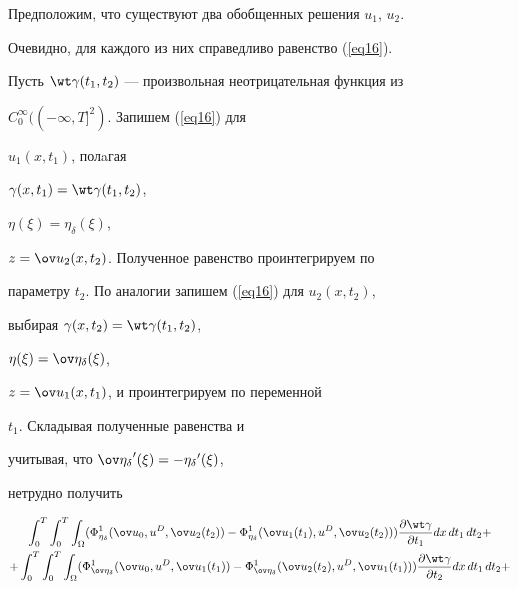 \begin{pf} 


Предположим, что существуют два обобщенных решения $u_{1}$, $u_{2}$.


Очевидно, для каждого из них справедливо равенство (\ref{eq16}). 


Пусть $\wt\gamma(t_{1},t_{2})$ --- произвольная неотрицательная функция из


$C^{\infty}_{0}((-\infty, T]^{2})$. Запишем (\ref{eq16}) для


$u_{1}(x,t_{1})$, полaгая 


$\gamma (x, t_{1})=\wt\gamma (t_{1}, t_{2})$,


$\eta (\xi)=\eta_{\delta} (\xi)$,


$z=\ov u_{2}(x, t_{2})$. Полученное равенство проинтегрируем по


параметру $t_{2}$. По аналогии запишем (\ref{eq16}) для $u_{2}(x, t_{2})$,


выбирая $\gamma (x, t_{2})=\wt \gamma (t_{1}, t_{2})$,


$\eta (\xi)=\ov \eta_{\delta} (\xi)$,


$z=\ov u_{1}(x, t_{1})$, и проинтегрируем по переменной 


$t_{1}$. Складывая полученные равенства и 


учитывая, что ${\ov \eta_{\delta}}'(\xi)=-{ \eta_{\delta}}'(\xi)$,


нетрудно получить


\begin{multline}


\label{eq25} 


\int_{0}^{T} \int_{0}^{T} \int_{\Omega}


(\Phi_{ \eta_{\delta}}^{1} (\ov u_{0}, u^{D}, \ov u_{2}(t_{2})) -


\Phi_{\eta_{\delta}}^{1} (\ov u_{1}(t_{1}), u^{D}, \ov u_{2}(t_{2})))


\frac{\partial \wt \gamma}{\partial t_{1}} dx\, dt_{1}\, dt_{2}+ \\


%


+\int_{0}^{T} \int_{0}^{T} \int_{\Omega}


(\Phi_{\ov \eta_{\delta}}^{1} (\ov u_{0}, u^{D}, \ov u_{1}(t_{1})) -


\Phi_{\ov \eta_{\delta}}^{1} (\ov u_{2}(t_{2}), u^{D}, \ov u_{1}(t_{1})))


\frac{\partial \wt \gamma}{\partial t_{2}} dx\, dt_{1}\, dt_{2}+ \\



\end{multline}
\end{pf}
